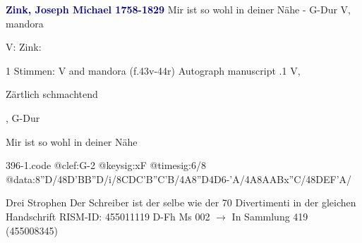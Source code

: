 \documentclass[twocolumn]{book}
\begin{document}
\newline \par \vspace{7pt} \textcolor{darkblue}{\textbf{Zink, Joseph Michael  1758-1829}}
\newline Mir ist so wohl in deiner Nähe - G-Dur
\newline V, mandora
\newline \begin{itshape}[at left, f.43v:] V: Zink:\end{itshape} 
\newline \textcolor{darkblue}{}  1 Stimmen: V and mandora  (f.43v-44r)
\newline Autograph manuscript
.1  V, \begin{itshape}Zärtlich schmachtend\end{itshape}, G-Dur
\newline \begin{footnotesize} Mir ist so wohl in deiner Nähe \end{footnotesize}  
\begin{filecontents*}{396-1.code}
@clef:G-2
@keysig:xF
@timesig:6/8
@data:8''D/48D'BB''D/i/{8CD}C{'B''C}'B/4A8''D4D6-'A/4A8A{AB}x''C/48DEF'A/
\end{filecontents*}
\newline
%
\newline Drei Strophen
\newline Der Schreiber ist der selbe wie der 70 Divertimenti in der gleichen Handschrift
\newline RISM-ID: 455011119
\newline D-Fh  Ms 002
\newline $\rightarrow$ In Sammlung 419 (455008345)
      
\end{document}
